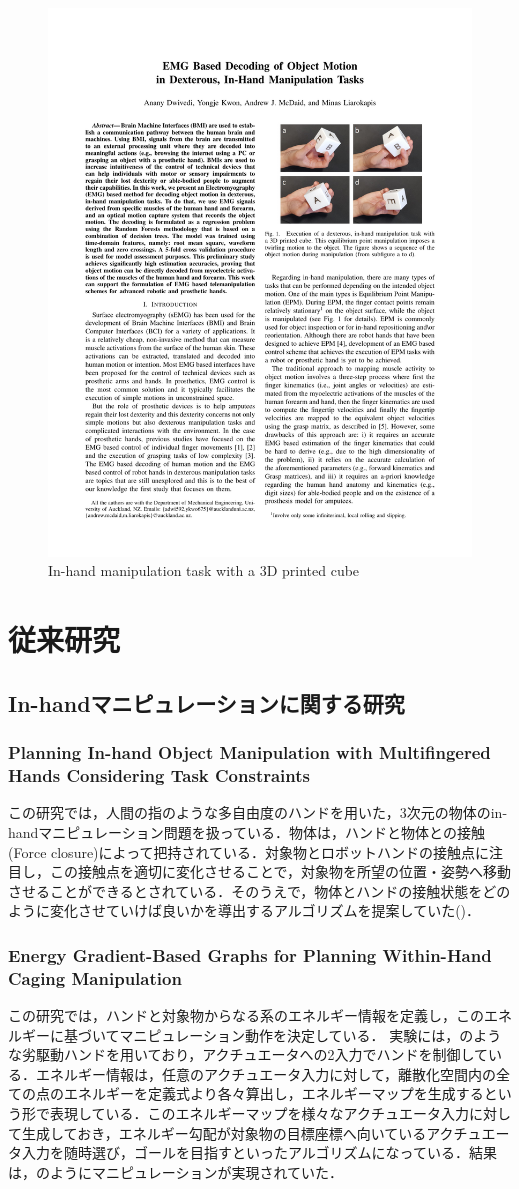 \documentclass[a4paper,twoside,12pt,papersize, dvipdfmx]{iirthesis}
\begin{document}
\begin{figure}[b]
\centering
\includegraphics[width=0.35\hsize]{fig/Introduction/Liarokapis2018_finger.pdf}
\caption{In-hand manipulation task with a 3D printed cube \cite{dwivedi2018}}
\label{fig::intro::ihm}
\end{figure}

\section{従来研究}\label{sec::intro::relatedresearch}
\subsection{In-handマニピュレーションに関する研究}
\subsubsection{Planning In-hand Object Manipulation with Multifingered Hands Considering Task Constraints \cite{hertkorn2013}}
この研究では，人間の指のような多自由度のハンドを用いた，3次元の物体のin-handマニピュレーション問題を扱っている．物体は，ハンドと物体との接触(Force closure)によって把持されている．対象物とロボットハンドの接触点に注目し，この接触点を適切に変化させることで，対象物を所望の位置・姿勢へ移動させることができるとされている．そのうえで，物体とハンドの接触状態をどのように変化させていけば良いかを導出するアルゴリズムを提案していた(\figref{})．

\subsubsection{Energy Gradient-Based Graphs for Planning Within-Hand Caging Manipulation \cite{bircher2019}}
この研究では，ハンドと対象物からなる系のエネルギー情報を定義し，このエネルギーに基づいてマニピュレーション動作を決定している．
実験には，のような劣駆動ハンドを用いており，アクチュエータへの2入力でハンドを制御している．エネルギー情報は，任意のアクチュエータ入力に対して，離散化空間内の全ての点のエネルギーを定義式より各々算出し，エネルギーマップを生成するという形で表現している．このエネルギーマップを様々なアクチュエータ入力に対して生成しておき，エネルギー勾配が対象物の目標座標へ向いているアクチュエータ入力を随時選び，ゴールを目指すといったアルゴリズムになっている．結果は，のようにマニピュレーションが実現されていた．
\end{document}
